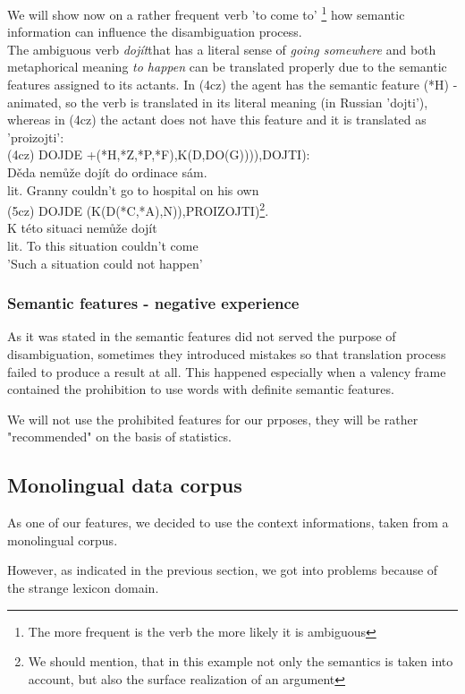 \documentclass[letterpaper]{article}
\begin{document}
We will show now on a rather frequent verb 'to come to' \footnote{The more frequent is the verb the more likely it is ambiguous} 
how semantic information can influence the disambiguation process.\\
The ambiguous verb \textit{dojít}that has a literal sense of \textit{going somewhere}
and both metaphorical meaning \textit{to happen} can be translated properly
due to the semantic features assigned to its actants. In (4cz) the
agent has the semantic feature (*H) - animated, so the verb is translated
in its literal meaning (in Russian 'dojti'), whereas in (4cz) the actant does not have this feature
and it is translated as 'proizojti':\\
(4cz) DOJDE +(*H,*Z,*P,*F),K(D,DO(G)))),DOJTI):\\
Děda nemůže dojít do ordinace sám.\\
lit. Granny couldn't go to hospital on his own\\

(5cz) DOJDE (K(D(*C,*A),N)),PROIZOJTI)\footnote{We should mention, that in this example
not only the semantics is taken into account, but also the surface realization of an argument}.\\
K této situaci nemůže dojít\\
lit. To this situation couldn't come\\
'Such a situation could not happen'

\subsubsection{Semantic features - negative experience}
As it was stated in \cite{KubonPHD2001} the semantic features did not
served the purpose of disambiguation, sometimes they introduced mistakes
so that translation process failed to produce a result at all. This
happened especially when a valency frame contained the prohibition
to use words with definite semantic features.

We will not use the prohibited features for our prposes, they will be rather "recommended" on the basis of
statistics.


\subsection{Monolingual data corpus}
As one of our features, we decided to use the context informations, taken from a monolingual corpus.

However, as indicated in the previous section, we got into problems because of the strange lexicon domain.
\end{document}
